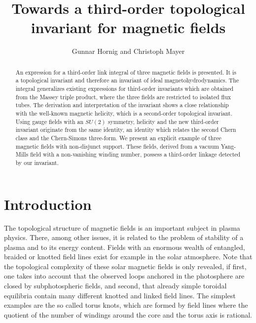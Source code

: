 \documentclass[10pt]{iopart}
\begin{document}
\title[Third-order topological invariant]{Towards a third-order topological invariant for magnetic fields}

\author{Gunnar Hornig and Christoph Mayer} 


\address{Theoretische Physik IV, Fakult\"at f\"ur Physik und Astronomie,\\
  Ruhr-Universit\"at Bochum, 44780 Bochum, Germany}






\begin{abstract}

An expression for a third-order link integral 
of three magnetic fields is presented.
It is a topological 
invariant and therefore an invariant of
ideal magnetohydrodynamics.
The integral generalizes existing expressions for third-order
invariants which are obtained from the Massey triple product,
where the three fields are restricted 
to isolated flux tubes.
The derivation and interpretation of the invariant shows a close
relationship 
with the well-known magnetic helicity,
which is a second-order topological invariant.
Using gauge fields with an $SU(2)$ symmetry, helicity and the new
third-order invariant originate from the same identity, an identity
which relates the second Chern class and the Chern-Simons three-form.
We present an explicit example of three magnetic fields with non-disjunct
support.
These fields, derived from a vacuum Yang-Mills field with a
non-vanishing winding number, 
possess a third-order linkage detected by our invariant. 

\end{abstract}

\section{Introduction}
The topological structure of magnetic fields
is an important subject in plasma physics.
There, among other issues, it is related to 
the problem of stability of a plasma and to its energy content.
Fields with an enormous wealth of entangled, braided or knotted
field lines exist for example in the solar atmosphere. Note that the
topological complexity of these solar magnetic fields is only revealed,
if first, one takes into account that the observed loops anchored in
the photosphere  are closed by subphotospheric fields, and second,
that already simple toroidal equilibria contain many  different
knotted and linked field lines. The simplest examples are the so called
torus knots, which are formed by field lines where the quotient of the
number of windings around the core and the torus axis is rational.
\end{document}
